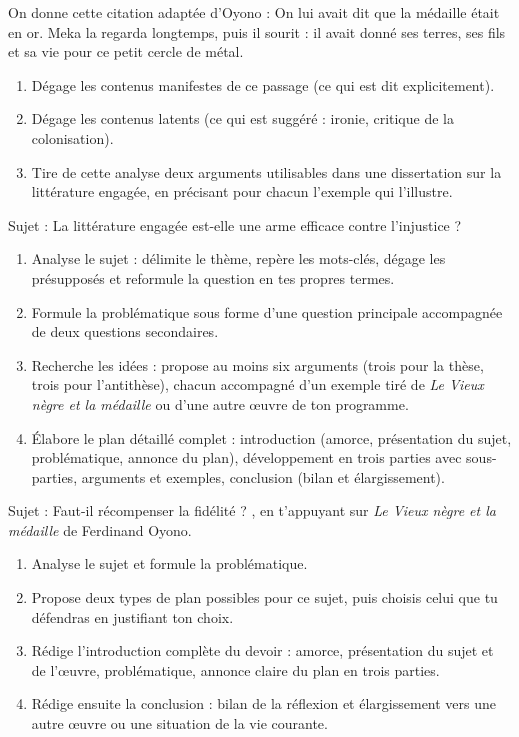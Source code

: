 \documentclass[11pt]{article}
\newcounter{popsec}
\newcounter{popsub}
\newcommand{\courssub}[1]{%
  \stepcounter{popsub}%
  \par\vspace{9pt}\noindent{\popxbold\fontsize{11.5}{13}\selectfont\color{popink}{\color{poporange}\thepopsec.\thepopsub}\hspace{6pt}#1}\par\nopagebreak\vspace{4pt}
}
\begin{document}
\begin{exercice}
On donne cette citation adaptée d'Oyono : \og On lui avait dit que la médaille était en or. Meka la regarda longtemps, puis il sourit : il avait donné ses terres, ses fils et sa vie pour ce petit cercle de métal. \fg{}
\begin{enumerate}
\item Dégage les contenus manifestes de ce passage (ce qui est dit explicitement).
\item Dégage les contenus latents (ce qui est suggéré : ironie, critique de la colonisation).
\item Tire de cette analyse deux arguments utilisables dans une dissertation sur la littérature engagée, en précisant pour chacun l'exemple qui l'illustre.
\end{enumerate}
\end{exercice}

\courssub{Je me prépare au Bac}

\begin{exercice}
Sujet : \og La littérature engagée est-elle une arme efficace contre l'injustice ? \fg{}
\begin{enumerate}
\item Analyse le sujet : délimite le thème, repère les mots-clés, dégage les présupposés et reformule la question en tes propres termes.
\item Formule la problématique sous forme d'une question principale accompagnée de deux questions secondaires.
\item Recherche les idées : propose au moins six arguments (trois pour la thèse, trois pour l'antithèse), chacun accompagné d'un exemple tiré de \emph{Le Vieux nègre et la médaille} ou d'une autre œuvre de ton programme.
\item Élabore le plan détaillé complet : introduction (amorce, présentation du sujet, problématique, annonce du plan), développement en trois parties avec sous-parties, arguments et exemples, conclusion (bilan et élargissement).
\end{enumerate}
\end{exercice}

\begin{exercice}
Sujet : \og Faut-il récompenser la fidélité ? \fg{}, en t'appuyant sur \emph{Le Vieux nègre et la médaille} de Ferdinand Oyono.
\begin{enumerate}
\item Analyse le sujet et formule la problématique.
\item Propose deux types de plan possibles pour ce sujet, puis choisis celui que tu défendras en justifiant ton choix.
\item Rédige l'introduction complète du devoir : amorce, présentation du sujet et de l'œuvre, problématique, annonce claire du plan en trois parties.
\item Rédige ensuite la conclusion : bilan de la réflexion et élargissement vers une autre œuvre ou une situation de la vie courante.
\end{enumerate}
\end{exercice}
\end{document}
